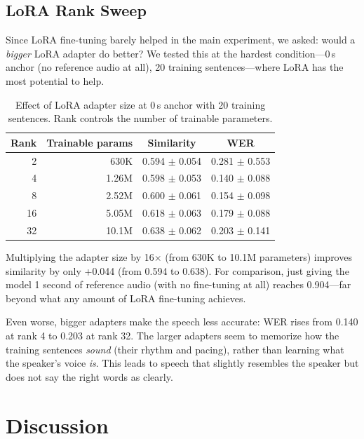 \documentclass[11pt, a4paper]{article}
\begin{document}
\subsection{LoRA Rank Sweep}

Since LoRA fine-tuning barely helped in the main experiment, we asked: would a \emph{bigger} LoRA adapter do better? We tested this at the hardest condition---0\,s anchor (no reference audio at all), 20 training sentences---where LoRA has the most potential to help.

\begin{table}[H]
\centering
\caption{Effect of LoRA adapter size at 0\,s anchor with 20 training sentences. Rank controls the number of trainable parameters.}
\label{tab:rank}
\begin{tabular}{@{}r r c c@{}}
\toprule
\textbf{Rank} & \textbf{Trainable params} & \textbf{Similarity} & \textbf{WER} \\
\midrule
2  & 630K   & 0.594 $\pm$ 0.054 & 0.281 $\pm$ 0.553 \\
4  & 1.26M  & 0.598 $\pm$ 0.053 & 0.140 $\pm$ 0.088 \\
8  & 2.52M  & 0.600 $\pm$ 0.061 & 0.154 $\pm$ 0.098 \\
16 & 5.05M  & 0.618 $\pm$ 0.063 & 0.179 $\pm$ 0.088 \\
32 & 10.1M  & 0.638 $\pm$ 0.062 & 0.203 $\pm$ 0.141 \\
\bottomrule
\end{tabular}
\end{table}

Multiplying the adapter size by 16$\times$ (from 630K to 10.1M parameters) improves similarity by only +0.044 (from 0.594 to 0.638). For comparison, just giving the model 1 second of reference audio (with no fine-tuning at all) reaches 0.904---far beyond what any amount of LoRA fine-tuning achieves.

Even worse, bigger adapters make the speech less accurate: WER rises from 0.140 at rank 4 to 0.203 at rank 32. The larger adapters seem to memorize how the training sentences \emph{sound} (their rhythm and pacing), rather than learning what the speaker's voice \emph{is}. This leads to speech that slightly resembles the speaker but does not say the right words as clearly.

\section{Discussion}
\end{document}
